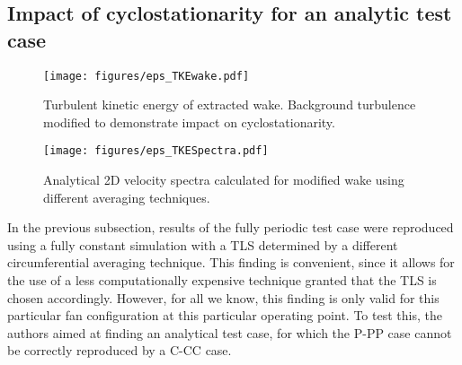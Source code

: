 \subsection{Impact of cyclostationarity for an analytic test case}
\begin{figure}[htb]
\parbox{0.39\textwidth}{
\centering
\texttt{[image: figures/eps\_TKEwake.pdf]} 
\caption{Turbulent kinetic energy of extracted wake.  Background turbulence modified to demonstrate impact on cyclostationarity.\label{fig:TKEWake_analytical} }
}\hfill
\parbox{0.59\textwidth}{
\texttt{[image: figures/eps\_TKESpectra.pdf]} 
\caption{Analytical 2D velocity spectra calculated for modified wake using different averaging techniques. \label{fig:TKESpectra_analytical} }
}
\end{figure}
In the previous subsection, results of the fully periodic test case were reproduced using a fully constant simulation with a TLS determined by a different circumferential averaging technique.  This finding is convenient, since it allows for the use of a less computationally expensive technique granted that the TLS is chosen accordingly. However, for all we know, this finding is only valid for this particular fan configuration at this particular operating point.  To test this, the authors aimed at finding an analytical test case, for which the P-PP case cannot be correctly reproduced by a C-CC case.


